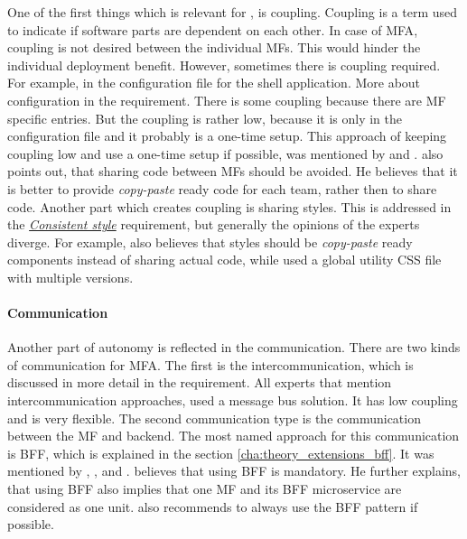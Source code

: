 One of the first things which is relevant for \textit{}, is coupling.
Coupling is a term used to indicate if software parts are dependent on each other.
In case of \ac{MFA}, coupling is not desired between the individual \acp{MF}.
This would hinder the individual deployment benefit.
However, sometimes there is coupling required.
For example, in the configuration file for the shell application.
More about configuration in the \textit{} requirement.
There is some coupling because there are \ac{MF} specific entries.
But the coupling is rather low, because it is only in the configuration file and it probably is a one-time setup.
This approach of keeping coupling low and use a one-time setup if possible, was mentioned by \textcite{Laug.2018} and \textcite{Dornenburg.2019}.
\citeauthor{Laug.2018} also points out, that sharing code between \acp{MF} should be avoided.
He believes that it is better to provide \textit{copy-paste} ready code for each team, rather then to share code.
Another part which creates coupling is sharing styles.
This is addressed in the \textit{\hyperref[cha:requirement_detail_style]{Consistent style} } requirement, but generally the opinions of the experts diverge.
For example, \citeauthor{Laug.2018} also believes that styles should be \textit{copy-paste} ready components instead of sharing actual code, while \textciteOlleck{} used a global utility \ac{CSS} file with multiple versions.



\paragraph{Communication}

Another part of autonomy is reflected in the communication.
There are two kinds of communication for \ac{MFA}.
The first is the intercommunication, which is discussed in more detail in the \textit{} requirement.
All experts that mention intercommunication approaches, used a message bus solution.
It has low coupling and is very flexible.
The second communication type is the communication between the \ac{MF} and backend.
The most named approach for this communication is \ac{BFF}, which is explained in the section \ref{cha:theory_extensions_bff}.
It was mentioned by \textciteSteyer{}, \textcite{Jackson.2019}, \textcite{Leitner.2020} and \textcite{Laug.2018}.
\citeauthor{Leitner.2020} believes that using \ac{BFF} is mandatory.
He further explains, that using \ac{BFF} also implies that one \ac{MF} and its \ac{BFF} microservice are considered as one unit.
\citeauthorSteyer{} also recommends to always use the \ac{BFF} pattern if possible.



